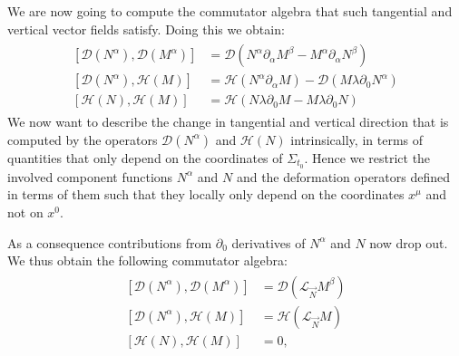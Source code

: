 \documentclass[a4paper,12pt, DIV=14, BCOR=5mm, twoside, headsepline, numbers=noenddot]{scrbook}
\begin{document}
We are now going to compute the commutator algebra that such tangential and vertical vector fields satisfy. Doing this we obtain:
\begin{align}
    \begin{aligned}
    \left [ \mathcal{D}(N^{\alpha}), \mathcal{D}(M^{\alpha}) \right] &= \mathcal{D}(N^\alpha \partial_{\alpha}M^{\beta} - M^{\alpha} \partial_{\alpha} N^{\beta}) \\
    \left[ \mathcal{D}(N^{\alpha}), \mathcal{H}(M) \right] &= \mathcal{H}(N^{\alpha} \partial_{\alpha} M) - \mathcal{D}(M \lambda \partial_0 N^{\alpha})\\
    \left[ \mathcal{H}(N), \mathcal{H}(M) \right ] &= \mathcal{H}(N \lambda \partial_0 M - M \lambda \partial_0N)
    \end{aligned}
\end{align}
We now want to describe the change in tangential and vertical direction that is computed by the operators $\mathcal{D}(N^{\alpha})$ and $\mathcal{H}(N)$ intrinsically, in terms of quantities that only depend on the coordinates of $\Sigma_{t_0}$.
Hence we restrict the involved component functions $N^{\alpha}$ and $N$ and the deformation operators defined in terms of them such that they locally only depend on the coordinates $x^{\mu}$ and not on $x^0$.

As a consequence contributions from $\partial_0$ derivatives of $N^{\alpha}$ and $N$ now drop out.
We thus obtain the following commutator algebra: 
\begin{align}\label{Alg}
    \begin{aligned}
    \left[ \mathcal{D}(N^{\alpha}), \mathcal{D}(M^{\alpha}) \right] &= \mathcal{D}(\mathcal{L}_{\vec{N}}M^{\beta}) \\
    \left[ \mathcal{D}(N^{\alpha}), \mathcal{H}(M) \right] &= \mathcal{H}(\mathcal{L}_{\vec{N}}M)\\
    \left[ \mathcal{H}(N), \mathcal{H}(M) \right] &= 0,
    \end{aligned}
\end{align}
\end{document}
